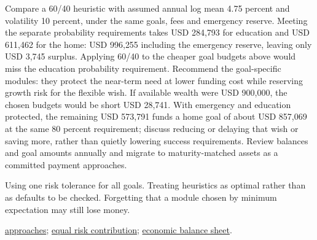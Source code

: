 \begin{qfmethod}
Compare a 60/40 heuristic with assumed annual log mean 4.75 percent and volatility 10 percent, under the same goals, fees and emergency reserve. Meeting the separate probability requirements takes USD 284{,}793 for education and USD 611{,}462 for the home: USD 996{,}255 including the emergency reserve, leaving only USD 3{,}745 surplus. Applying 60/40 to the cheaper goal budgets above would miss the education probability requirement. Recommend the goal-specific modules: they protect the near-term need at lower funding cost while reserving growth risk for the flexible wish. If available wealth were USD 900{,}000, the chosen budgets would be short USD 28{,}741. With emergency and education protected, the remaining USD 573{,}791 funds a home goal of about USD 857{,}069 at the same 80 percent requirement; discuss reducing or delaying that wish or saving more, rather than quietly lowering success requirements. Review balances and goal amounts annually and migrate to maturity-matched assets as a committed payment approaches.

 Using one risk tolerance for all goals. Treating heuristics as optimal rather than as defaults to be checked. Forgetting that a module chosen by minimum expectation may still lose money.

 \hyperref[def:allocation-approaches-risk]{approaches}; \hyperref[meth:equal-risk-contribution]{equal risk contribution}; \hyperref[meth:economic-balance-sheet-allocation]{economic balance sheet}.

\end{qfmethod}

